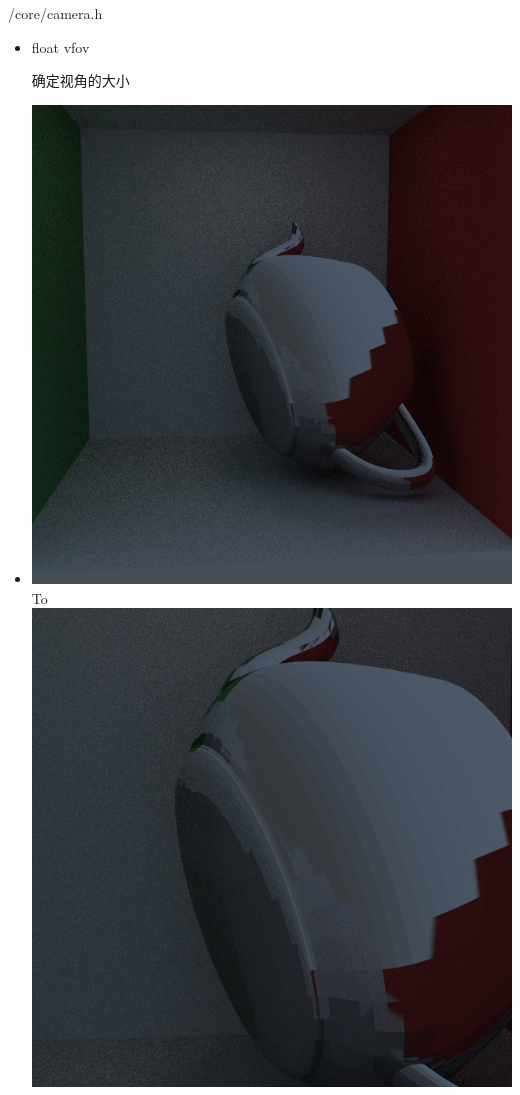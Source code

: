 \documentclass{beamer}
\begin{document}
\begin{frame} {/core/camera.h}
\begin{itemize}
\item 
\begin{semiverbatim} float vfov \end{semiverbatim}
确定视角的大小
\item \includegraphics[scale=0.2]{cornellbox_teapot_camera_move} \normalsize To 
\includegraphics[scale=0.2]{cornellbox_teapot_camera_fov}
\end{itemize}
\end{frame}
\end{document}
